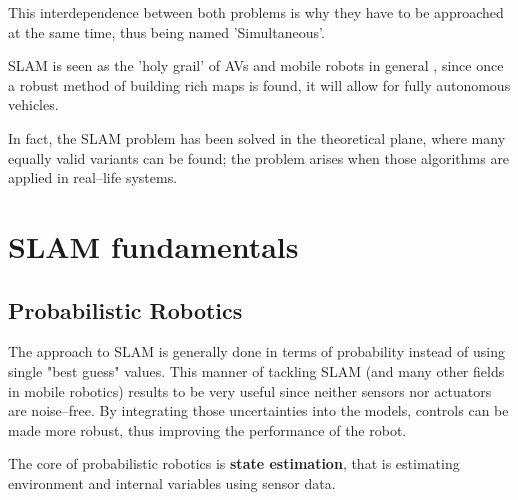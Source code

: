 This interdependence between both problems is why they have to be approached at the same time, thus being named 'Simultaneous'.

SLAM is seen as the 'holy grail' of AVs and mobile robots in general , since once a robust method of building rich maps is found, it will allow for fully autonomous vehicles.

In fact, the SLAM problem has been solved in the theoretical plane, where many equally valid variants can be found; the problem arises when those algorithms are applied in real--life systems.

\section{SLAM fundamentals}

\subsection{Probabilistic Robotics}

The approach to SLAM is generally done in terms of probability instead of using single "best guess" values. This manner of tackling SLAM (and many other fields in mobile robotics) results to be very useful since neither sensors nor actuators are noise--free. By integrating those uncertainties into the models, controls can be made more robust, thus improving the performance of the robot.

The core of probabilistic robotics is \textbf{state estimation}, that is estimating environment and internal variables using sensor data. 

